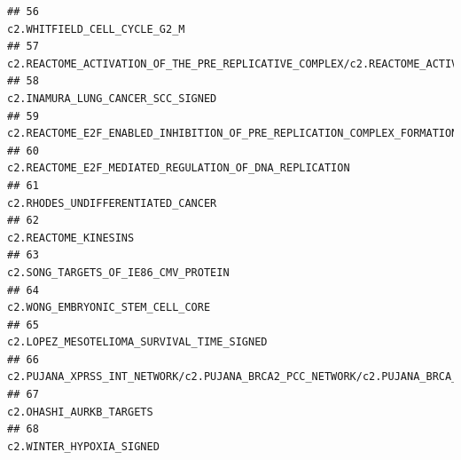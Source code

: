 \documentclass{article}\usepackage[]{graphicx}\usepackage[]{color}
\makeatletter
\newenvironment{kframe}{%
 \def\at@end@of@kframe{}%
 \ifinner\ifhmode%
  \def\at@end@of@kframe{\end{minipage}}%
  \begin{minipage}{\columnwidth}%
 \fi\fi%
 \def\FrameCommand##1{\hskip\@totalleftmargin \hskip-\fboxsep
 \colorbox{shadecolor}{##1}\hskip-\fboxsep
     \hskip-\linewidth \hskip-\@totalleftmargin \hskip\columnwidth}%
 \MakeFramed {\advance\hsize-\width
   \@totalleftmargin\z@ \linewidth\hsize
   \@setminipage}}%
 {\par\unskip\endMakeFramed%
 \at@end@of@kframe}
\newenvironment{knitrout}{}{} %
\makeatother
\begin{document}
\begin{knitrout}
\begin{kframe}
\begin{verbatim}
## 56                                                                                                                                                                                      c2.WHITFIELD_CELL_CYCLE_G2_M
## 57                                                                c2.REACTOME_ACTIVATION_OF_THE_PRE_REPLICATIVE_COMPLEX/c2.REACTOME_ACTIVATION_OF_ATR_IN_RESPONSE_TO_REPLICATION_STRESS/c2.REACTOME_G2_M_CHECKPOINTS
## 58                                                                                                                                                                                 c2.INAMURA_LUNG_CANCER_SCC_SIGNED
## 59                                                                                                                                           c2.REACTOME_E2F_ENABLED_INHIBITION_OF_PRE_REPLICATION_COMPLEX_FORMATION
## 60                                                                                                                                                            c2.REACTOME_E2F_MEDIATED_REGULATION_OF_DNA_REPLICATION
## 61                                                                                                                                                                                 c2.RHODES_UNDIFFERENTIATED_CANCER
## 62                                                                                                                                                                                              c2.REACTOME_KINESINS
## 63                                                                                                                                                                               c2.SONG_TARGETS_OF_IE86_CMV_PROTEIN
## 64                                                                                                                                                                                  c2.WONG_EMBRYONIC_STEM_CELL_CORE
## 65                                                                                                                                                                         c2.LOPEZ_MESOTELIOMA_SURVIVAL_TIME_SIGNED
## 66                                                                                                                           c2.PUJANA_XPRSS_INT_NETWORK/c2.PUJANA_BRCA2_PCC_NETWORK/c2.PUJANA_BRCA_CENTERED_NETWORK
## 67                                                                                                                                                                                           c2.OHASHI_AURKB_TARGETS
## 68                                                                                                                                                                                          c2.WINTER_HYPOXIA_SIGNED

\end{verbatim}
\end{kframe}
\end{knitrout}
\end{document}
